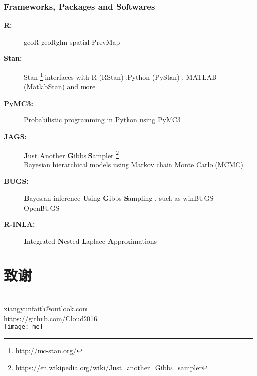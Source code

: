 \documentclass[xcolor=x11names,UTF8]{ctexbeamer}
\begin{document}
\begin{frame}[allowframebreaks]
\frametitle{Frameworks, Packages and Softwares}

\begin{description}
\item[\textbf{R:}] geoR geoRglm spatial PrevMap \\
\citet{R-geoR,R-geoRglm,R-spatial,Giorgi2016}

\item[\textbf{Stan:}] Stan \footnote{\scriptsize \url{http://mc-stan.org/} }  
interfaces with R (RStan) ,Python (PyStan) , MATLAB (MatlabStan) 
and  more \\ \citet{Stan2015,Stan2017}

\item[\textbf{PyMC3:}] Probabilistic programming in Python using PyMC3 \\ \citet{Salvatier2016}

\item[\textbf{JAGS:}] \textbf{J}ust \textbf{A}nother \textbf{G}ibbs \textbf{S}ampler \footnote{\scriptsize \url{https://en.wikipedia.org/wiki/Just_another_Gibbs_sampler}} \\
Bayesian hierarchical models using Markov chain Monte Carlo (MCMC)
\item[\textbf{BUGS:}] \textbf{B}ayesian inference \textbf{U}sing \textbf{G}ibbs \textbf{S}ampling ,
such as winBUGS, OpenBUGS 
\item[\textbf{R-INLA:}] \textbf{I}ntegrated \textbf{N}ested \textbf{L}aplace \textbf{A}pproximations \\
\citet{Rue2009,R-INLA,Rue2017arXiv}
\end{description}


\end{frame}

\section*{致谢}

\begin{frame}
\centering
\color{red}
\Huge {}\\
\bigskip
\color{Blue4}
\normalsize
\href{mailto:me@somewhere.com}{xiangyunfaith@outlook.com} \\
\href{https://github.com/Cloud2016}{https://github.com/Cloud2016} \\
\bigskip
\texttt{[image: me]}
\end{frame}


\begin{frame}[allowframebreaks]


\end{frame}
\end{document}
